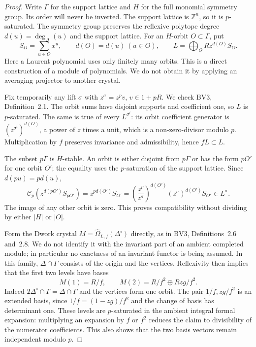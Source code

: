 \documentclass[11pt,a4paper]{article}
\theoremstyle{definition}\newtheorem{definition}[theorem]{Definition}
\theoremstyle{remark}\newtheorem{remark}[theorem]{Remark}
\numberwithin{equation}{section}
\begin{document}
\begin{proof}
Write $\Gamma$ for the support lattice and $H$ for the full monomial
symmetry group. Its order will never be inverted. The support lattice is $\mathbb Z^n$, so it is $p$-saturated.
The symmetry group preserves the reflexive polytope degree
$d(u)=\deg_\Delta(u)$ and the support lattice. For an $H$-orbit
$O\subset\Gamma$, put
\[
 S_O=\sum_{u\in O}x^u,\qquad d(O)=d(u)\ (u\in O),\qquad
 L=\bigoplus_O R z^{d(O)}S_O.
\]
Here a Laurent polynomial uses only finitely many orbits.
This is a direct construction of a module of polynomials. We do not
obtain it by applying an averaging projector to another crystal.

Fix temporarily any lift $\sigma$ with
$z^\sigma=z^pv$, $v\in1+pR$. We check BV3, Definition~2.1.
The orbit sums have disjoint supports and coefficient one, so $L$ is
$p$-saturated. The same is true of every $L^{\sigma^i}$: its orbit
coefficient generator is $(z^{\sigma^i})^{d(O)}$, a power of $z$
times a unit, which is a non-zero-divisor modulo $p$.
Multiplication by $f$ preserves invariance and admissibility, hence
$fL\subset L$.

The subset $p\Gamma$ is $H$-stable. An orbit is either disjoint from
$p\Gamma$ or has the form $pO'$ for one orbit $O'$; the equality uses
the $p$-saturation of the support lattice. Since $d(pu)=pd(u)$,
\[
 \mathscr C_p(z^{d(pO')}S_{pO'})
   =z^{pd(O')}S_{O'}
   =\left(\frac{z^p}{z^\sigma}\right)^{d(O')}
        (z^\sigma)^{d(O')}S_{O'}\in L^\sigma.
\]
The image of any other orbit is zero. This proves compatibility
without dividing by either $|H|$ or $|O|$.

Form the Dwork crystal
$M=\widehat\Omega_{L,f}(\Delta^\circ)$ directly, as in BV3,
Definitions~2.6 and~2.8. We do not identify it with the invariant
part of an ambient completed module; in particular no exactness of
an invariant functor is being assumed. In this family,
$\Delta\cap\Gamma$ consists of the origin and the vertices.
Reflexivity then implies that the first two levels have bases
\[
 M(1)=R/f,\qquad M(2)=R/f^2\oplus Rzg/f^2.
\]
Indeed $2\Delta^\circ\cap\Gamma=\Delta\cap\Gamma$ and the
vertices form one orbit. The pair $1/f,zg/f^2$ is an extended basis,
since $1/f=(1-zg)/f^2$ and the change of basis has determinant one.
These levels are $p$-saturated in the ambient integral formal
expansion: multiplying an expansion by $f$ or $f^2$ reduces the
claim to divisibility of the numerator coefficients. This also
shows that the two basis vectors remain independent modulo $p$.


\end{proof}
\end{document}
